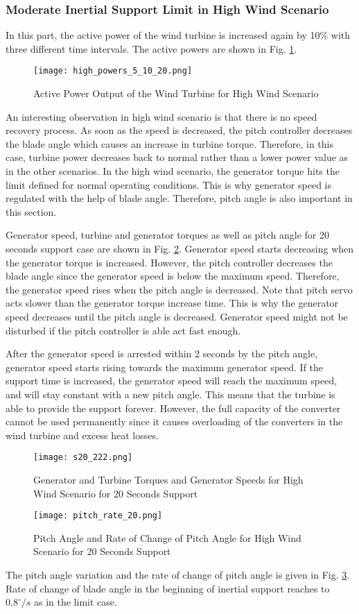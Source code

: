 \subsubsection{Moderate Inertial Support Limit in High Wind Scenario}
In this part, the active power of the wind turbine is increased again by 10\% with three different time intervals. The active powers are shown in Fig. \ref{high_powerss}.\par
\begin{figure}[h!]
	\centering
	\texttt{[image: high\_powers\_5\_10\_20.png]}
	\caption{Active Power Output of the Wind Turbine for High Wind Scenario}
	\label{high_powerss}
\end{figure}
An interesting observation in high wind scenario is that there is no speed recovery process. As soon as the speed is decreased, the pitch controller decreases the blade angle which causes an increase in turbine torque. Therefore, in this case, turbine power decreases back to normal rather than a lower power value as in the other scenarios. In the high wind scenario, the generator torque hits the limit defined for normal operating conditions. This is why generator speed is regulated with the help of blade angle. Therefore, pitch angle is also important in this section. \par
Generator speed, turbine and generator torques as well as pitch angle for 20 seconds support case are shown in Fig. \ref{high_s20}. Generator speed starts decreasing when the generator torque is increased. However, the pitch controller decreases the blade angle since the generator speed is below the maximum speed. Therefore, the generator speed rises when the pitch angle is decreased. Note that pitch servo acts slower than the generator torque increase time. This is why the generator speed decreases until the pitch angle is decreased. Generator speed might not be disturbed if the pitch controller is able act fast enough.\par
After the generator speed is arrested within 2 seconds by the pitch angle, generator speed starts rising towards the maximum generator speed. If the support time is increased, the generator speed will reach the maximum speed, and will stay constant with a new pitch angle. This means that the turbine is able to provide the support forever. However, the full capacity of the converter cannot be used permanently since it causes  overloading of the converters in the wind turbine and excess heat losses. \par
\begin{figure}[h!]
	\centering
	\texttt{[image: s20\_222.png]}
	\caption{Generator and Turbine Torques and Generator Speeds for High Wind Scenario for 20 Seconds Support}
	\label{high_s20}
\end{figure}
\begin{figure}[h!]
	\centering
	\texttt{[image: pitch\_rate\_20.png]}
	\caption{Pitch Angle and Rate of Change of Pitch Angle for High Wind Scenario for 20 Seconds Support}
	\label{high_pitch}
\end{figure}
The pitch angle variation and the rate of change of pitch angle is given in Fig. \ref{high_pitch}. Rate of change of blade angle in the beginning of inertial support reaches to $0.8^{\circ}/s$ as in the limit case.
